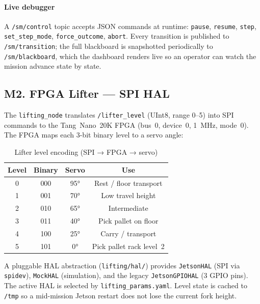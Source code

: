 \documentclass[conference]{IEEEtran}
\begin{document}
\paragraph{Live debugger}
A \texttt{/sm/control} topic accepts JSON commands at runtime:
\texttt{pause}, \texttt{resume}, \texttt{step},
\texttt{set\_step\_mode}, \texttt{force\_outcome}, \texttt{abort}.
Every transition is published to \texttt{/sm/transition}; the full
blackboard is snapshotted periodically to \texttt{/sm/blackboard}, which
the dashboard renders live so an operator can watch the mission advance
state by state.

\subsection{M2. FPGA Lifter --- SPI HAL}

The \texttt{lifting\_node} translates \texttt{/lifter\_level} (UInt8,
range 0–5) into SPI commands to the Tang~Nano~20K FPGA
(bus~0, device~0, 1~MHz, mode~0). The FPGA maps each 3-bit binary
level to a servo angle:

\begin{table}[h]
\caption{Lifter level encoding (SPI → FPGA → servo)}
\label{tab:lifter_encoding}
\renewcommand{\arraystretch}{1.2}
\centering
\begin{tabular}{cccc}
\toprule
\textbf{Level} & \textbf{Binary} & \textbf{Servo} & \textbf{Use} \\
\midrule
0 & 000 & 95° & Rest / floor transport \\
1 & 001 & 70° & Low travel height \\
2 & 010 & 65° & Intermediate \\
3 & 011 & 40° & Pick pallet on floor \\
4 & 100 & 25° & Carry / transport \\
5 & 101 &  0° & Pick pallet rack level~2 \\
\bottomrule
\end{tabular}
\end{table}

A pluggable HAL abstraction (\texttt{lifting/hal/}) provides
\texttt{JetsonHAL} (SPI via \texttt{spidev}), \texttt{MockHAL}
(simulation), and the legacy \texttt{JetsonGPIOHAL} (3 GPIO pins).
The active HAL is selected by \texttt{lifting\_params.yaml}.
Level state is cached to \texttt{/tmp} so a mid-mission Jetson restart
does not lose the current fork height.
\end{document}
